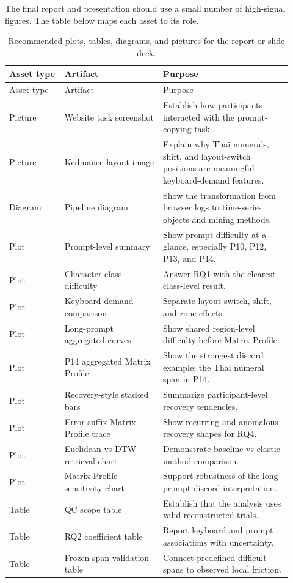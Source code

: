 \documentclass[11pt,a4paper]{article}
\begin{document}
The final report and presentation should use a small number of high-signal figures. The table below maps each asset to its role.

\begin{longtable}{>{\raggedright\arraybackslash}p{0.18\linewidth} >{\raggedright\arraybackslash}p{0.32\linewidth} >{\raggedright\arraybackslash}p{0.42\linewidth}}
\caption{Recommended plots, tables, diagrams, and pictures for the report or slide deck.}
\label{tab:asset_plan}\\
\toprule
Asset type & Artifact & Purpose \\
\midrule
\endfirsthead
\toprule
Asset type & Artifact & Purpose \\
\midrule
\endhead
Picture & Website task screenshot & Establish how participants interacted with the prompt-copying task. \\
Picture & Kedmanee layout image & Explain why Thai numerals, shift, and layout-switch positions are meaningful keyboard-demand features. \\
Diagram & Pipeline diagram & Show the transformation from browser logs to time-series objects and mining methods. \\
Plot & Prompt-level summary & Show prompt difficulty at a glance, especially P10, P12, P13, and P14. \\
Plot & Character-class difficulty & Answer RQ1 with the clearest class-level result. \\
Plot & Keyboard-demand comparison & Separate layout-switch, shift, and zone effects. \\
Plot & Long-prompt aggregated curves & Show shared region-level difficulty before Matrix Profile. \\
Plot & P14 aggregated Matrix Profile & Show the strongest discord example: the Thai numeral span in P14. \\
Plot & Recovery-style stacked bars & Summarize participant-level recovery tendencies. \\
Plot & Error-suffix Matrix Profile trace & Show recurring and anomalous recovery shapes for RQ4. \\
Plot & Euclidean-vs-DTW retrieval chart & Demonstrate baseline-vs-elastic method comparison. \\
Plot & Matrix Profile sensitivity chart & Support robustness of the long-prompt discord interpretation. \\
Table & QC scope table & Establish that the analysis uses valid reconstructed trials. \\
Table & RQ2 coefficient table & Report keyboard and prompt associations with uncertainty. \\
Table & Frozen-span validation table & Connect predefined difficult spans to observed local friction. \\
\bottomrule
\end{longtable}
\end{document}
